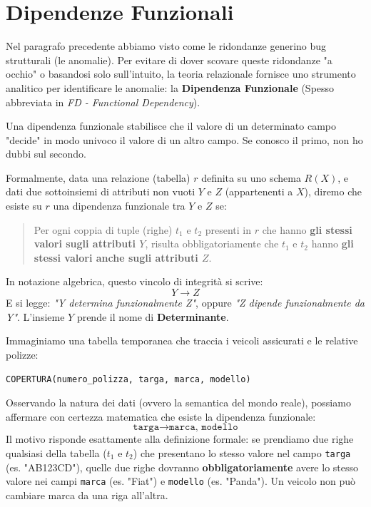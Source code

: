 \section{Dipendenze Funzionali}

Nel paragrafo precedente abbiamo visto come le ridondanze generino bug strutturali (le anomalie). Per evitare di dover scovare queste ridondanze "a occhio" o basandosi solo sull'intuito, la teoria relazionale fornisce uno strumento analitico per identificare le anomalie: la \textbf{Dipendenza Funzionale} (Spesso abbreviata in \textit{FD - Functional Dependency}).

Una dipendenza funzionale stabilisce che il valore di un determinato campo "decide" in modo univoco il valore di un altro campo. Se conosco il primo, non ho dubbi sul secondo.

Formalmente, data una relazione (tabella) $r$ definita su uno schema $R(X)$, e dati due sottoinsiemi di attributi non vuoti $Y$ e $Z$ (appartenenti a $X$), diremo che esiste su $r$ una dipendenza funzionale tra $Y$ e $Z$ se:

\begin{quote}
Per ogni coppia di tuple (righe) $t_1$ e $t_2$ presenti in $r$ che hanno \textbf{gli stessi valori sugli attributi $Y$}, risulta obbligatoriamente che $t_1$ e $t_2$ hanno \textbf{gli stessi valori anche sugli attributi $Z$}.
\end{quote}

In notazione algebrica, questo vincolo di integrità si scrive:
$$ Y \rightarrow Z $$
E si legge: \textit{"Y determina funzionalmente Z"}, oppure \textit{"Z dipende funzionalmente da Y"}. L'insieme $Y$ prende il nome di \textbf{Determinante}.

\begin{example}
Immaginiamo una tabella temporanea che traccia i veicoli assicurati e le relative polizze:

\begin{center}
    \texttt{COPERTURA(numero\_polizza, targa, marca, modello)}
\end{center}


Osservando la natura dei dati (ovvero la semantica del mondo reale), possiamo affermare con certezza matematica che esiste la dipendenza funzionale:
$$ \texttt{targa} \rightarrow \texttt{marca, modello} $$
Il motivo risponde esattamente alla definizione formale: se prendiamo due righe qualsiasi della tabella ($t_1$ e $t_2$) che presentano lo stesso valore nel campo \texttt{targa} (es. "AB123CD"), quelle due righe dovranno \textbf{obbligatoriamente} avere lo stesso valore nei campi \texttt{marca} (es. "Fiat") e \texttt{modello} (es. "Panda"). Un veicolo non può cambiare marca da una riga all'altra.
\end{example}

